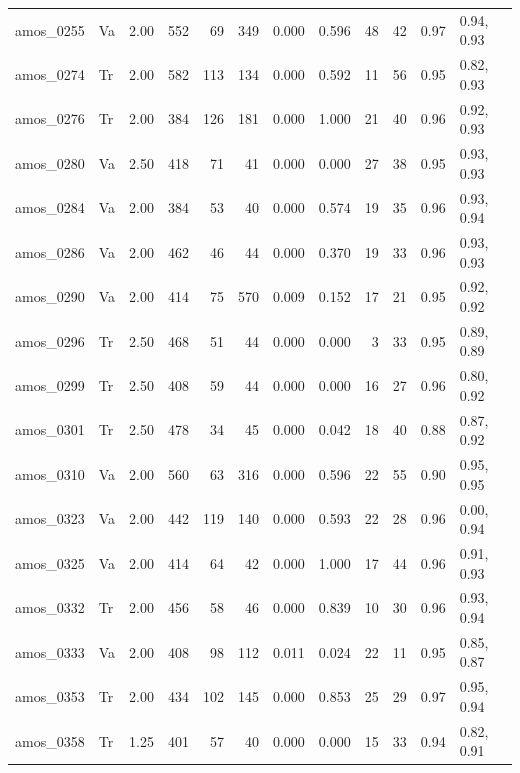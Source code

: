\begin{table}[tp]
\begin{tabularx}{\textwidth}{@{}l l r r r r r r r r r l@{}}
amos\_0255 & Va & 2.00 & 552 & 69 & 349 & 0.000 & 0.596 & 48 & 42 & 0.97 & 0.94, 0.93 \\
amos\_0274 & Tr & 2.00 & 582 & 113 & 134 & 0.000 & 0.592 & 11 & 56 & 0.95 & 0.82, 0.93 \\
amos\_0276 & Tr & 2.00 & 384 & 126 & 181 & 0.000 & 1.000 & 21 & 40 & 0.96 & 0.92, 0.93 \\
amos\_0280 & Va & 2.50 & 418 & 71 & 41 & 0.000 & 0.000 & 27 & 38 & 0.95 & 0.93, 0.93 \\
amos\_0284 & Va & 2.00 & 384 & 53 & 40 & 0.000 & 0.574 & 19 & 35 & 0.96 & 0.93, 0.94 \\
amos\_0286 & Va & 2.00 & 462 & 46 & 44 & 0.000 & 0.370 & 19 & 33 & 0.96 & 0.93, 0.93 \\
amos\_0290 & Va & 2.00 & 414 & 75 & 570 & 0.009 & 0.152 & 17 & 21 & 0.95 & 0.92, 0.92 \\
amos\_0296 & Tr & 2.50 & 468 & 51 & 44 & 0.000 & 0.000 & 3 & 33 & 0.95 & 0.89, 0.89 \\
amos\_0299 & Tr & 2.50 & 408 & 59 & 44 & 0.000 & 0.000 & 16 & 27 & 0.96 & 0.80, 0.92 \\
amos\_0301 & Tr & 2.50 & 478 & 34 & 45 & 0.000 & 0.042 & 18 & 40 & 0.88 & 0.87, 0.92 \\
amos\_0310 & Va & 2.00 & 560 & 63 & 316 & 0.000 & 0.596 & 22 & 55 & 0.90 & 0.95, 0.95 \\
amos\_0323 & Va & 2.00 & 442 & 119 & 140 & 0.000 & 0.593 & 22 & 28 & 0.96 & 0.00, 0.94 \\
amos\_0325 & Va & 2.00 & 414 & 64 & 42 & 0.000 & 1.000 & 17 & 44 & 0.96 & 0.91, 0.93 \\
amos\_0332 & Tr & 2.00 & 456 & 58 & 46 & 0.000 & 0.839 & 10 & 30 & 0.96 & 0.93, 0.94 \\
amos\_0333 & Va & 2.00 & 408 & 98 & 112 & 0.011 & 0.024 & 22 & 11 & 0.95 & 0.85, 0.87 \\
amos\_0353 & Tr & 2.00 & 434 & 102 & 145 & 0.000 & 0.853 & 25 & 29 & 0.97 & 0.95, 0.94 \\
amos\_0358 & Tr & 1.25 & 401 & 57 & 40 & 0.000 & 0.000 & 15 & 33 & 0.94 & 0.82, 0.91 \\
\bottomrule
\end{tabularx}
\end{table}
